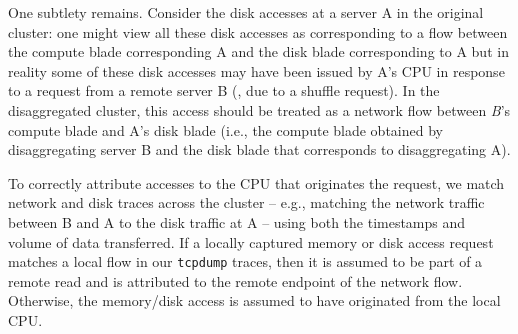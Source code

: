 One subtlety remains. Consider the disk accesses at a server A in the original cluster: one might view all these disk accesses as corresponding to a flow between the compute blade corresponding A and the disk blade corresponding to A but in reality some of these disk accesses may have been issued by A's CPU in response to a request from a remote server B (\eg, due to a shuffle request). 
In the disaggregated cluster, this access should be treated as a network flow between \emph{B}'s compute blade and A's disk blade (i.e., the 
compute blade obtained by disaggregating server B and the disk blade that corresponds to disaggregating A).



To correctly attribute accesses to the CPU that originates the request, we match network and disk traces across the cluster -- e.g., matching the network traffic between B and A to the disk traffic at A -- using both the timestamps and volume of data transferred. 
If a locally captured memory or disk access request matches a local flow in our {\tt tcpdump} traces, then it is assumed to be part of a remote read and is attributed to the remote endpoint of the network flow.
Otherwise, the memory/disk access is assumed to have originated from the local CPU. 


